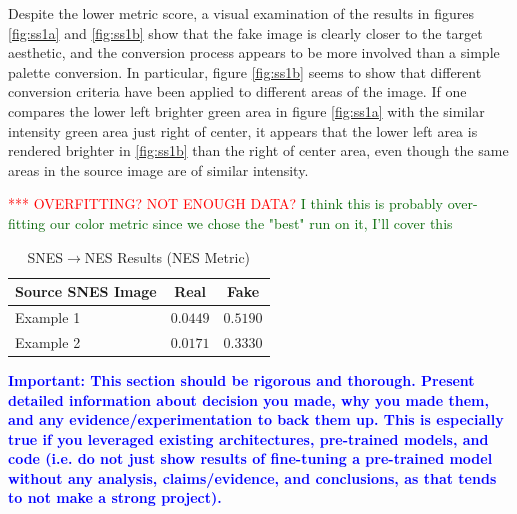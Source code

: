 \documentclass[10pt,twocolumn,letterpaper]{article}
\begin{document}
Despite the lower metric score, a visual examination of the results in figures \ref{fig:ss1a} and \ref{fig:ss1b} show that the fake image is clearly closer to the target aesthetic, and the conversion process appears to be more involved than a simple palette conversion.
In particular, figure \ref{fig:ss1b} seems to show that different conversion criteria have been applied to different areas of the image. If one compares the lower left brighter green area in figure \ref{fig:ss1a} with the similar intensity green area just right of center, it appears that the lower left area is rendered brighter in \ref{fig:ss1b} than the right of center area, even though the same areas in the source image are of similar intensity.

\textcolor{red}{*** OVERFITTING? NOT ENOUGH DATA?}
\textcolor{darkgreen} {I think this is probably over-fitting our color metric since we chose the "best" run on it, I'll cover this}

\begin{table}
   \begin{center}
      \begin{tabular}{|l|c|c|}
         \hline
         Source SNES Image & Real     & Fake     \\
         \hline\hline
         Example 1         & $0.0449$ & $0.5190$ \\
         Example 2         & $0.0171$ & $0.3330$ \\
         \hline
      \end{tabular}
   \end{center}
   \caption{SNES$\rightarrow$NES Results (NES Metric)}
   \label{tab:nesresults}
\end{table}


\textbf{\textcolor{blue}{Important: This section should be rigorous and thorough. Present detailed information about decision you made, why you made them, and any evidence/experimentation to back them up. This is especially true if you leveraged existing architectures, pre-trained models, and code (i.e. do not just show results of fine-tuning a pre-trained model without any analysis, claims/evidence, and conclusions, as that tends to not make a strong project). }}
\end{document}
